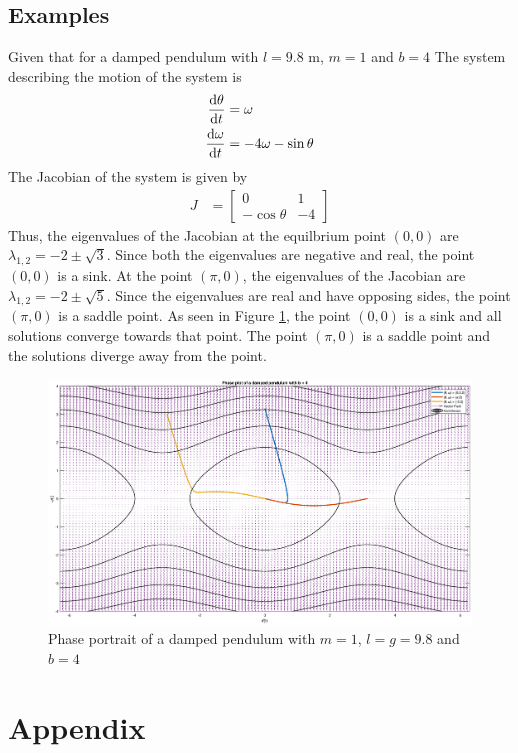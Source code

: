 \documentclass[11pt,1in]{article}
\newenvironment{Example}[2][Example]{\begin{trivlist}
		\item[\hskip \labelsep {\bfseries #1}\hskip \labelsep {\bfseries #2.}]}{\end{trivlist}}
\begin{document}
\subsection{Examples}
\begin{Example}{1}
	\cite[pp. 528]{diff_eq}
	Given that for a damped pendulum with $l = 9.8$ \si{\meter}, $m = 1$ and $b  =  4$
	The system describing the motion of the system is 
	\begin{align*}
	\derivative{\theta}{t} &= \omega \\
	\derivative{\omega}{t} &= - 4\omega - \sin\theta
	\end{align*}
	The Jacobian of the system is given by 
	\begin{align*}
	J &= \begin{bmatrix}
	0 & 1 \\
	-\cos\theta & -4 
	\end{bmatrix}
	\end{align*}
	Thus, the eigenvalues of the Jacobian at the equilbrium point $(0,0)$ are $\lambda_{1,2} = -2 \pm \sqrt{3}$. Since both the eigenvalues are negative and real, the point $(0,0)$ is a sink. At the point $(\pi, 0)$, the eigenvalues of the Jacobian are $\lambda_{1,2} = -2 \pm \sqrt{5}$. Since the eigenvalues are real and have opposing sides, the point $(\pi,0)$ is a saddle point. As seen in Figure \ref{fig:example_damped_pendulum}, the point $(0,0)$ is a sink and all solutions converge towards that point. The point $(\pi, 0)$ is a saddle point and the solutions diverge away from the point. 
	\begin{figure}[H]
		\centering
		\includegraphics[trim={2in 0 1.5in 0}, width=\linewidth]{Figures/example_damped_pendulum}
		\caption{Phase portrait of a damped pendulum with $m = 1$, $l = g = 9.8$ and $b = 4$}
		\label{fig:example_damped_pendulum}
	\end{figure}
\end{Example}
\section{Appendix}



\end{document}
